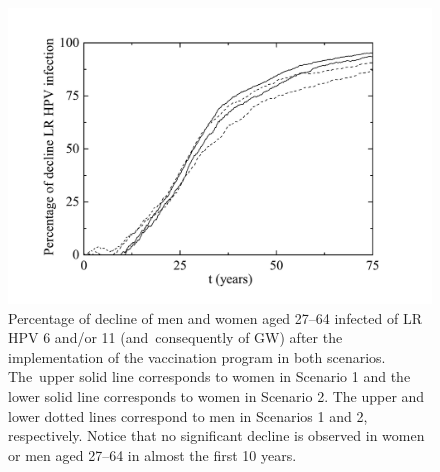 
\begin{figure}[H]
	\centering
	\includegraphics[scale=0.4]{PercentageDeclineolder.pdf}
	\vspace{-12pt}
	\caption{Percentage of decline of men and women aged 27--64 infected of LR HPV 6 and/or 11 (and~consequently of GW) after the implementation of the vaccination program in both scenarios. The~upper solid line corresponds to women in Scenario 1 and the lower solid line corresponds to women in Scenario 2. The upper and lower dotted lines correspond to men in Scenarios 1 and 2, respectively. Notice that no significant decline is observed in women or men aged 27--64 in almost the first 10 years.}
	\label{fig4}
\end{figure}
\vspace{-40pt}

